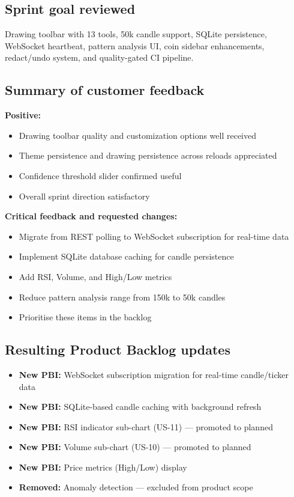 \documentclass[11pt,a4paper]{article}
\begin{document}
\subsection{Sprint goal reviewed}
Drawing toolbar with 13 tools, 50k candle support, SQLite persistence, WebSocket heartbeat, pattern analysis UI, coin sidebar enhancements, redact/undo system, and quality-gated CI pipeline.

\subsection{Summary of customer feedback}

\textbf{Positive:}
\begin{itemize}
    \item Drawing toolbar quality and customization options well received
    \item Theme persistence and drawing persistence across reloads appreciated
    \item Confidence threshold slider confirmed useful
    \item Overall sprint direction satisfactory
\end{itemize}

\textbf{Critical feedback and requested changes:}
\begin{itemize}
    \item Migrate from REST polling to WebSocket subscription for real-time data
    \item Implement SQLite database caching for candle persistence
    \item Add RSI, Volume, and High/Low metrics
    \item Reduce pattern analysis range from 150k to 50k candles
    \item Prioritise these items in the backlog
\end{itemize}

\subsection{Resulting Product Backlog updates}
\begin{itemize}
    \item \textbf{New PBI:} WebSocket subscription migration for real-time candle/ticker data
    \item \textbf{New PBI:} SQLite-based candle caching with background refresh
    \item \textbf{New PBI:} RSI indicator sub-chart (US-11) --- promoted to planned
    \item \textbf{New PBI:} Volume sub-chart (US-10) --- promoted to planned
    \item \textbf{New PBI:} Price metrics (High/Low) display
    \item \textbf{Removed:} Anomaly detection --- excluded from product scope
\end{itemize}
\end{document}
